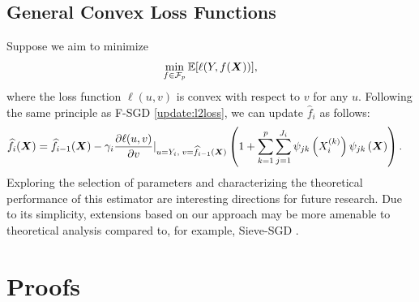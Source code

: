 \subsection{General Convex Loss Functions}
Suppose we aim to minimize 
\begin{align*}
    \min_{f \in \mathcal{F}_p} \mathbb{E}[\ell(Y, f(\bm{X}))],
\end{align*}
where the loss function $\ell(u,v)$ is convex with respect to $v$ for any $u$. Following the same principle as F-SGD \eqref{update:l2loss}, we  can update $\hat f_i$ as follows:
\begin{align*}
    &\widehat{f}_i(\bm{X}) = \widehat{f}_{i-1}(\bm{X}) - \gamma_i\frac{\partial \ell(u,v)}{\partial v}\vert_{u = Y_i,\; v = \widehat f_{i-1}(\bm{X})} \left(1+\sum_{k=1}^p\sum_{j=1}^{J_i}\psi_{jk}\left(X_i^{(k)}\right)\psi_{jk}\left(\bm{X}\right)\right).
\end{align*}
Exploring the selection of parameters and characterizing the theoretical performance of this estimator are interesting directions for future research. Due to its simplicity, extensions based on our approach may be more amenable to theoretical analysis compared to, for example, Sieve-SGD \citep{zhang2022sieve}.

\section{Proofs}\label{appdx:proof}

